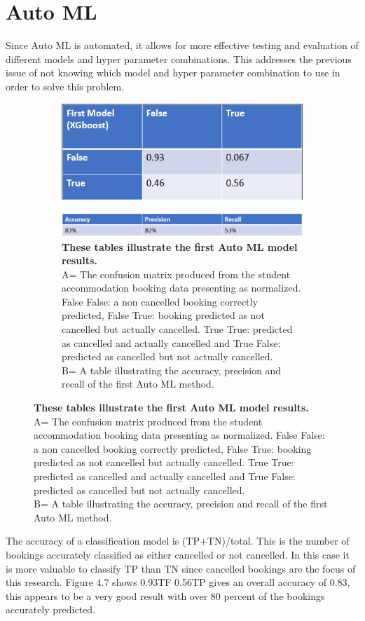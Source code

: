 \section{Auto ML}

Since Auto ML is automated, it allows for more effective testing and evaluation of different models and hyper parameter combinations. This addresses the previous issue of not knowing which model and hyper parameter combination to use in order to solve this problem.

 \begin{figure}[H]
 \centering
  \begin{subfigure}{A\textwidth}
    \includegraphics[width=10cm]{figures/xgboost_confusion_matrix.png}
  \end{subfigure}

  \centering
  \begin{subfigure}{B\textwidth}
    \includegraphics[width=10cm]{figures/original_results.png}
    \caption{\textbf{These tables illustrate the first Auto ML model results.}\vspace{2mm} \\ A= The confusion matrix produced from the student accommodation booking data presenting as normalized. False False: a non cancelled booking correctly predicted, False True: booking predicted as not cancelled but actually cancelled. True True: predicted as cancelled and actually cancelled and True False: predicted as cancelled but not actually cancelled. \vspace{2mm} \\B= A table illustrating the accuracy, precision and recall of the first Auto ML method.} \label{fig:1b}
  \end{subfigure}
\end{figure}

The accuracy of a classification model is (TP+TN)/total. This is the number of bookings accurately classified as either cancelled or not cancelled. In this case it is more valuable to classify TP than TN since cancelled bookings are the focus of this research. Figure 4.7 shows  0.93TF 0.56TP gives an overall accuracy of 0.83, this appears to be a very good result with over 80 percent of the bookings accurately predicted.

